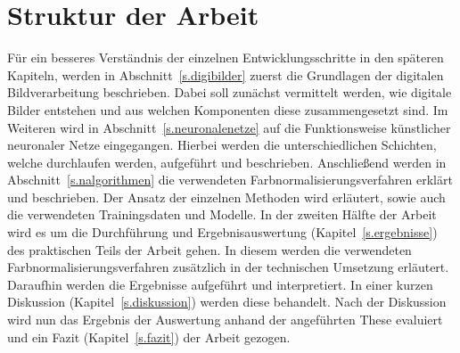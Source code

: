   \section{Struktur der Arbeit}\label{Struktur} 
Für ein besseres Verständnis der einzelnen Entwicklungsschritte in den späteren Kapiteln, werden in Abschnitt~\ref{s.digibilder} zuerst die Grundlagen der digitalen Bildverarbeitung beschrieben. Dabei soll zunächst vermittelt werden, wie digitale Bilder entstehen und aus welchen Komponenten diese zusammengesetzt sind. Im Weiteren wird in Abschnitt~\ref{s.neuronalenetze} auf die Funktionsweise künstlicher neuronaler Netze eingegangen. Hierbei werden die unterschiedlichen Schichten, welche durchlaufen werden, aufgeführt und beschrieben. Anschließend werden in Abschnitt~\ref{s.nalgorithmen} die verwendeten Farbnormalisierungsverfahren erklärt und beschrieben. Der Ansatz der einzelnen Methoden wird erläutert, sowie auch die verwendeten Trainingsdaten und Modelle. In der zweiten Hälfte der Arbeit wird es um die Durchführung und Ergebnisauswertung (Kapitel~\ref{s.ergebnisse}) des praktischen Teils der Arbeit gehen. In diesem werden die verwendeten Farbnormalisierungsverfahren zusätzlich in der technischen Umsetzung erläutert. Daraufhin werden die Ergebnisse aufgeführt und interpretiert. In einer kurzen Diskussion (Kapitel~\ref{s.diskussion}) werden diese behandelt. Nach der Diskussion wird nun das Ergebnis der Auswertung anhand der angeführten These evaluiert und ein Fazit (Kapitel~\ref{s.fazit}) der Arbeit gezogen.